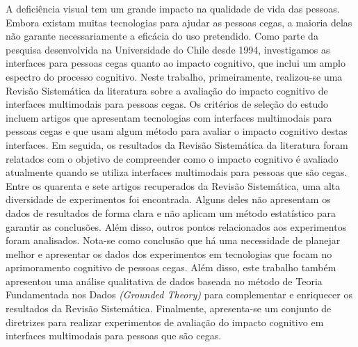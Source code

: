 A deficiência visual tem um grande impacto na qualidade de vida das pessoas. Embora existam muitas tecnologias para ajudar as pessoas cegas, a maioria delas não garante necessariamente a eficácia do uso pretendido. Como parte da pesquisa desenvolvida na Universidade do Chile desde 1994, investigamos as interfaces para pessoas cegas quanto ao impacto cognitivo, que inclui um amplo espectro do processo cognitivo. Neste trabalho, primeiramente, realizou-se uma Revisão Sistemática da literatura sobre a avaliação do impacto cognitivo de interfaces multimodais para pessoas cegas. Os critérios de seleção do estudo incluem artigos que apresentam tecnologias com interfaces multimodais para pessoas cegas e que usam algum método para avaliar o impacto cognitivo destas interfaces. Em seguida, os resultados da Revisão Sistemática da literatura foram relatados com o objetivo de compreender como o impacto cognitivo é avaliado atualmente quando se utiliza interfaces multimodais para pessoas que são cegas. Entre os quarenta e sete artigos recuperados da Revisão Sistemática, uma alta diversidade de experimentos foi encontrada. Alguns deles não apresentam os dados de resultados de forma clara e não aplicam um método estatístico para garantir as conclusões. Além disso, outros pontos relacionados aos experimentos foram analisados. Nota-se como conclusão que há uma necessidade de planejar melhor e apresentar os dados dos experimentos em tecnologias que focam no aprimoramento cognitivo de pessoas cegas. Além disso, este trabalho também apresentou uma análise qualitativa de dados baseada no método  de Teoria Fundamentada nos Dados \textit{(Grounded Theory)} para complementar e enriquecer os resultados da Revisão Sistemática. Finalmente, apresenta-se um conjunto de diretrizes para realizar experimentos de avaliação do impacto cognitivo em interfaces multimodais para pessoas que são cegas.


